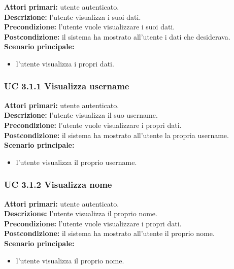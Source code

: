 \noindent
\textbf{Attori primari:} utente autenticato.\\
\textbf{Descrizione:} l'utente visualizza i suoi dati.\\
\textbf{Precondizione:} l'utente vuole visualizzare i suoi dati.\\
\textbf{Postcondizione:} il sistema ha mostrato all'utente i dati che desiderava.\\
\textbf{Scenario principale:}
\begin{itemize}
\item l'utente visualizza i propri dati.
\end{itemize}

\subsubsection{UC 3.1.1 Visualizza username}
\noindent 
\textbf{Attori primari:} utente autenticato.\\
\textbf{Descrizione:} l'utente visualizza il suo username.\\
\textbf{Precondizione:} l'utente vuole visualizzare i propri dati.\\
\textbf{Postcondizione:} il sistema ha mostrato all'utente la propria username.\\
\textbf{Scenario principale:}
\begin{itemize}
\item l'utente visualizza il proprio username.
\end{itemize}

\subsubsection{UC 3.1.2 Visualizza nome}
\noindent 
\textbf{Attori primari:} utente autenticato.\\
\textbf{Descrizione:} l'utente visualizza il proprio nome.\\
\textbf{Precondizione:} l'utente vuole visualizzare i propri dati.\\
\textbf{Postcondizione:} il sistema ha mostrato all'utente il proprio nome.\\
\textbf{Scenario principale:}
\begin{itemize}
\item l'utente visualizza il proprio nome.
\end{itemize}

